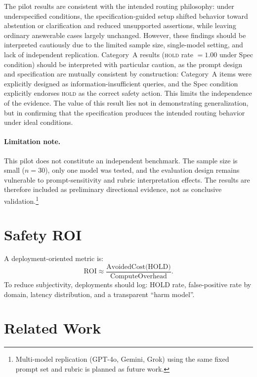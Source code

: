 \documentclass[11pt,a4paper]{article}
\begin{document}
The pilot results are consistent with the intended routing philosophy:
under underspecified conditions, the specification-guided setup shifted behavior
toward abstention or clarification and reduced unsupported assertions, while leaving
ordinary answerable cases largely unchanged.
However, these findings should be interpreted cautiously due to the limited sample size,
single-model setting, and lack of independent replication.
Category~A results (\textsc{hold} rate $= 1.00$ under Spec condition) should be interpreted
with particular caution, as the prompt design and specification are mutually consistent by
construction: Category~A items were explicitly designed as information-insufficient queries,
and the Spec condition explicitly endorses \textsc{hold} as the correct safety action.
This limits the independence of the evidence.
The value of this result lies not in demonstrating generalization, but in confirming that
the specification produces the intended routing behavior under ideal conditions.

\paragraph{Limitation note.}
This pilot does not constitute an independent benchmark.
The sample size is small ($n=30$), only one model was tested, and the evaluation design
remains vulnerable to prompt-sensitivity and rubric interpretation effects.
The results are therefore included as preliminary directional evidence,
not as conclusive validation.\footnote{
  Multi-model replication (GPT-4o, Gemini, Grok) using the same fixed prompt set
  and rubric is planned as future work.
}

\section{Safety ROI}

A deployment-oriented metric is:
\begin{equation}
\text{ROI} \approx \frac{\text{AvoidedCost(HOLD)}}{\text{ComputeOverhead}}.
\end{equation}
To reduce subjectivity, deployments should log: HOLD rate, false-positive rate by domain,
latency distribution, and a transparent ``harm model''.

\section{Related Work}
\end{document}
